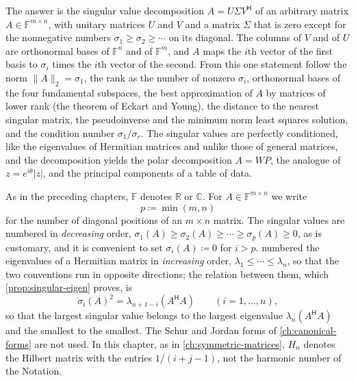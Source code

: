 The answer is the singular value decomposition $A=U\Sigma V^{\mathsf H}$ of an arbitrary matrix $A\in\mathbb F^{m\times n}$, with unitary matrices $U$ and $V$ and a matrix $\Sigma$ that is zero except for the nonnegative numbers $\sigma_1\ge\sigma_2\ge\cdots$ on its diagonal. The columns of $V$ and of $U$ are orthonormal bases of $\mathbb F^n$ and of $\mathbb F^m$, and $A$ maps the $i$th vector of the first basis to $\sigma_i$ times the $i$th vector of the second. From this one statement follow the norm $\|A\|_2=\sigma_1$, the rank as the number of nonzero $\sigma_i$, orthonormal bases of the four fundamental subspaces, the best approximation of $A$ by matrices of lower rank (the theorem of Eckart and Young), the distance to the nearest singular matrix, the pseudoinverse and the minimum norm least squares solution, and the condition number $\sigma_1/\sigma_r$. The singular values are perfectly conditioned, like the eigenvalues of Hermitian matrices and unlike those of general matrices, and the decomposition yields the polar decomposition $A=WP$, the analogue of $z=e^{i\theta}|z|$, and the principal components of a table of data.

As in the preceding chapters, $\mathbb F$ denotes $\mathbb R$ or $\mathbb C$. For $A\in\mathbb F^{m\times n}$ we write
\[
p\coloneqq\min(m,n)
\]
for the number of diagonal positions of an $m\times n$ matrix. The singular values are numbered in \emph{decreasing} order, $\sigma_1(A)\ge\sigma_2(A)\ge\cdots\ge\sigma_p(A)\ge0$, as is customary, and it is convenient to set $\sigma_i(A)\coloneqq0$ for $i>p$.  numbered the eigenvalues of a Hermitian matrix in \emph{increasing} order, $\lambda_1\le\cdots\le\lambda_n$, so that the two conventions run in opposite directions; the relation between them, which \cref{prop:singular-eigen} proves, is
\begin{equation}
\sigma_i(A)^2=\lambda_{n+1-i}(A^{\mathsf H}A)\qquad(i=1,\ldots,n),
\label{eq:sigma-lambda}
\end{equation}
so that the largest singular value belongs to the largest eigenvalue $\lambda_n(A^{\mathsf H}A)$ and the smallest to the smallest. The Schur and Jordan forms of \cref{ch:canonical-forms} are not used. In this chapter, as in \cref{ch:symmetric-matrices}, $H_n$ denotes the Hilbert matrix with the entries $1/(i+j-1)$, not the harmonic number of the Notation.


